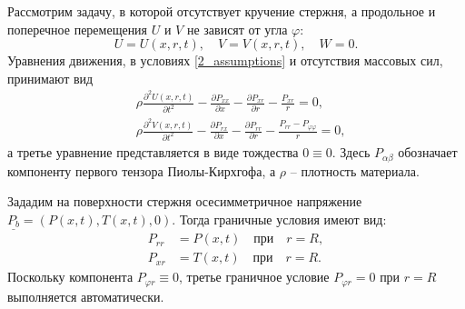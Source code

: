 \documentclass[12pt, a4paper]{report}
\newcommand{\vect}[1]{\underline{#1}}
\newcommand{\tens}[1]{\underline{\underline{#1}}}
\begin{document}
Рассмотрим задачу, в которой отсутствует кручение стержня, а продольное и поперечное перемещения $U$ и $V$ не зависят от угла $\varphi$:
\begin{equation}\label{2_assumptions}
U = U(x,r,t), \quad V = V(x,r,t), \quad W = 0.
\end{equation}
Уравнения движения, в условиях \eqref{2_assumptions} и отсутствия массовых сил, принимают вид
\begin{align}
\label{2_eq1_0}
&\rho  \frac{\partial^2 U(x,r,t)}{\partial t^2}-\frac{\partial P_{x x}}{\partial x}-\frac{\partial P_{xr}}{\partial r}-\frac{P_{xr}}{r} = 0,\\
\label{2_eq2_0}
&\rho  \frac{\partial^2 V(x,r,t)}{\partial t^2} - \frac{\partial P_{rx}}{\partial x}-\frac{\partial P_{rr}}{\partial r}-\frac{P_{rr} - P_{\varphi\varphi}}{r} = 0,
\end{align}
а третье уравнение представляется в виде тождества $0\equiv 0$. Здесь $P_{\alpha \beta}$ обозначает компоненту первого тензора Пиолы-Кирхгофа, а $\rho$ -- плотность материала.

Зададим на поверхности стержня осесимметричное напряжение $\vect{P_b} = (P(x,t), T(x,t), 0)$. Тогда граничные условия имеют вид:
\begin{align}
P_{rr} &= P(x, t) \quad \mbox{при} \quad r = R \label{2_bc_rr},\\
P_{xr} &= T(x, t) \quad \mbox{при} \quad r = R \label{2_bc_rx}.
\end{align}
Поскольку компонента $ P_{\varphi r} \equiv 0 $, третье граничное условие $P_{\varphi r} = 0$ при $r = R$ выполняется автоматически.
\end{document}
